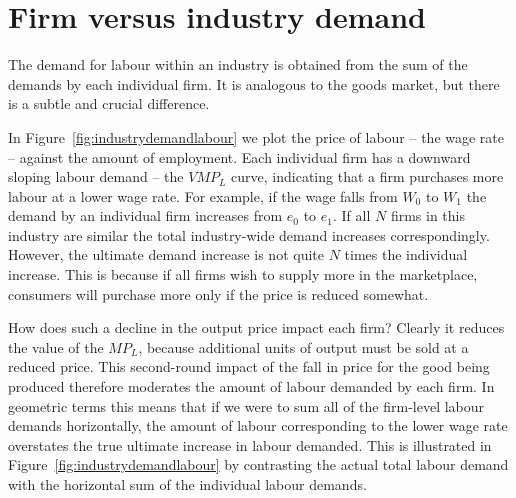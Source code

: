 \section{Firm versus industry demand}\label{sec:ch12sec2}

The demand for labour within an industry is obtained from the sum of the demands by each individual firm. It is analogous to the goods market, but there is a subtle and crucial difference.

In Figure~\ref{fig:industrydemandlabour} we plot the price of labour -- the wage rate -- against the amount of employment. Each individual firm has a downward sloping labour demand -- the $VMP_L$ curve, indicating that a firm purchases more labour at a lower wage rate. For example, if the wage falls from $W_0$ to $W_1$ the demand by an individual firm increases from $e_0$ to $e_1$. If all $N$ firms in this industry are similar the total industry-wide demand increases correspondingly. However, the ultimate demand increase is not quite $N$ times the individual increase. This is because if all firms wish to supply more in the marketplace, consumers will purchase more only if the price is reduced somewhat.



How does such a decline in the output price impact each firm? Clearly it reduces the value of the $MP_L$, because additional units of output must be sold at a reduced price. This second-round impact of the fall in price for the good being produced therefore moderates the amount of labour demanded by each firm. In geometric terms this means that if we were to sum all of the firm-level labour demands horizontally, the amount of labour corresponding to the lower wage rate overstates the true ultimate increase in labour demanded. This is illustrated in Figure~\ref{fig:industrydemandlabour} by contrasting the actual total labour demand with the horizontal sum of the individual labour demands.